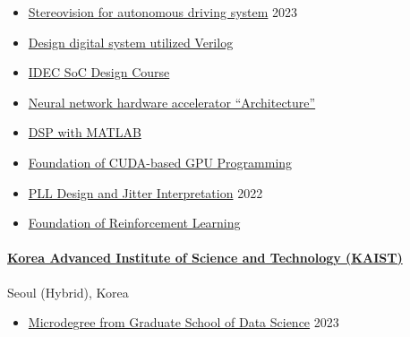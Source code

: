 \documentclass[a4paper,9pt]{extarticle}
\begin{document}
\begin{itemize}
    \item \href{https://github.com/user-attachments/assets/2d45999d-1f66-467c-b956-e16b5ed71593}{Stereovision for autonomous driving system}                            \hfill 2023
    \item \href{https://github.com/user-attachments/assets/32bfc1d6-18cf-44a4-83dc-209b4f4686ac}{Design digital system utilized Verilog}
    \item \href{https://github.com/user-attachments/assets/583762df-f208-4216-b836-a6a1921ec34b}{IDEC SoC Design Course}
    \item \href{https://github.com/user-attachments/assets/094a58df-f320-45fb-aba3-707f4a7fd8f7}{Neural network hardware accelerator ``Architecture''}
    \item \href{https://github.com/user-attachments/assets/9f74252d-eae5-40b2-b305-ea90576100aa}{DSP with MATLAB}
    \item \href{https://github.com/user-attachments/assets/0fc8c167-bef1-4857-a664-a1b82c95e306}{Foundation of CUDA-based GPU Programming}    
\end{itemize}
\begin{itemize}
    \item \href{https://github.com/user-attachments/assets/b4e013f1-d7b8-4505-a4f5-12e270097549}{PLL Design and Jitter Interpretation}                                  \hfill 2022
    \item \href{https://github.com/user-attachments/assets/73933790-2b15-46ae-8ac2-c6eaf31d9e01}{Foundation of Reinforcement Learning}                                  
\end{itemize}


\paragraph{\large{\href{https://gsds.kaist.ac.kr}{Korea Advanced Institute of Science and Technology (KAIST)}}}  \hfill Seoul (Hybrid), Korea
\begin{itemize}
    \item \href{https://github.com/user-attachments/assets/b404e1df-2798-48de-8385-c9a6c7389b38}{Microdegree from Graduate School of Data Science}                      \hfill 2023 \\
\end{itemize}
\end{document}
